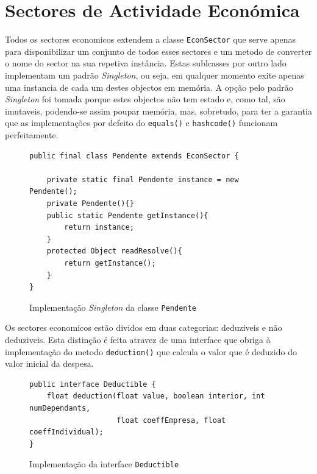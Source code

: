 \documentclass[12pt,a4paper]{report}
\begin{document}
\pagebreak

    \section{Sectores de Actividade Económica}
    \label{sec:econsector}
    Todos os sectores economicos extendem a classe \texttt{EconSector}
    que serve apenas para disponibilizar um conjunto de todos esses sectores e um
    metodo de converter o nome do sector na sua repetiva instância.
    Estas sublcasses por outro lado implementam um padrão \textit{Singleton}, ou
    seja, em qualquer momento exite apenas uma instancia de cada um destes
    objectos em memória. A opção pelo padrão \textit{Singleton} foi tomada porque
    estes objectos não tem estado e, como tal, são imutaveis, podendo-se assim
    poupar memória, mas, sobretudo, para ter a garantia que as implementações por
    defeito do \texttt{equals()} e \texttt{hashcode()}
    funcionam perfeitamente.
    \begin{figure}[h]
        \begin{verbatim}
public final class Pendente extends EconSector {

    private static final Pendente instance = new Pendente();
    private Pendente(){}
    public static Pendente getInstance(){
        return instance;
    }
    protected Object readResolve(){
        return getInstance();
    }
}
        \end{verbatim}
        \caption{Implementação \textit{Singleton} da classe
                \texttt{Pendente}}
        \label{fig:singleton}
    \end{figure}

    Os sectores economicos estão dividos em duas categorias: deduziveis
    e não deduziveis. Esta distinção é feita atravez de uma interface que
    obriga à implementação do metodo \texttt{deduction()} que calcula
    o valor que é deduzido do valor inicial da despesa.
    \begin{figure}[h]
        \begin{verbatim}
public interface Deductible {
    float deduction(float value, boolean interior, int numDependants,
                    float coeffEmpresa, float coeffIndividual);
}
        \end{verbatim}
        \caption{Implementação da interface \texttt{Deductible}}
        \label{fig:deductible}
    \end{figure}
\end{document}
